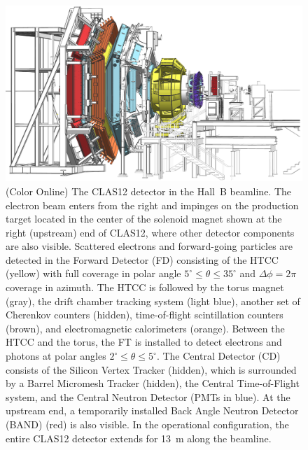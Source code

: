 \documentclass[final,3p,twocolumn]{elsarticle}
\begin{document}
\begin{figure}[t]
\centering
\centerline{\includegraphics[width=1.8\columnwidth]{CLAS12-side-3.png}}
\caption{(Color Online) The CLAS12 detector in the Hall~B beamline. The electron beam enters from the right and impinges on
the production target located in the center of the solenoid magnet shown at the right (upstream) end of CLAS12,
where other detector components are also visible. Scattered electrons and forward-going particles are detected
in the Forward Detector (FD) consisting of the HTCC (yellow) with full coverage in polar angle
$5^\circ \le \theta \le 35^\circ$ and $\Delta \phi = 2\pi$ coverage in azimuth. The HTCC is followed by the
torus magnet (gray), the drift chamber tracking system (light blue), another set of Cherenkov counters (hidden),
time-of-flight scintillation counters (brown), and electromagnetic calorimeters (orange). Between the HTCC and the
torus, the FT is installed to detect electrons and photons at polar angles $2^\circ \le \theta \le 5^\circ$. The Central
Detector (CD) consists of the Silicon Vertex Tracker (hidden), which is surrounded by a Barrel Micromesh Tracker
(hidden), the Central Time-of-Flight system, and the Central Neutron Detector (PMTs in blue). At the upstream end,
a temporarily installed Back Angle Neutron Detector (BAND) (red) is also visible. In the operational configuration,
the entire CLAS12 detector extends for 13~m along the beamline.} 
\label{clas12}
\end{figure}
\end{document}
